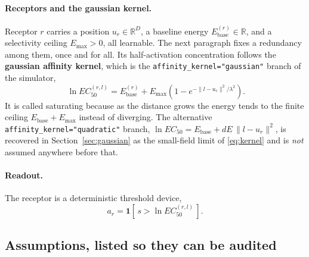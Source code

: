 \documentclass[11pt,a4paper]{article}
\newcommand{\RR}{\mathbb{R}}
\newcommand{\Ebase}{E_{\mathrm{base}}}
\newcommand{\Emax}{E_{\mathrm{max}}}
\begin{document}
\paragraph{Receptors and the gaussian kernel.} Receptor $r$ carries a position
$u_r \in \RR^D$, a baseline energy $\Ebase^{(r)} \in \RR$, and a selectivity ceiling
$\Emax > 0$, all learnable. The next paragraph fixes a redundancy among them, once
and for all. Its half-activation concentration follows
the \textbf{gaussian affinity kernel}, which is the
\texttt{affinity\_kernel="gaussian"} branch of the simulator,
\begin{equation}
  \boxed{\;\ln EC_{50}^{(r,l)}
   = \Ebase^{(r)} + \Emax\left(1 - e^{-\|l-u_r\|^2/\lambda^2}\right). }
  \label{eq:kernel}
\end{equation}
It is called saturating because as the distance grows the energy tends to the finite
ceiling $\Ebase + \Emax$ instead of diverging. The alternative
\texttt{affinity\_kernel="quadratic"} branch, $\ln EC_{50} = \Ebase + dE\,\|l-u_r\|^2$,
is recovered in Section~\ref{sec:gaussian} as the small-field limit of \eqref{eq:kernel}
and is \emph{not} assumed anywhere before that.

\paragraph{Readout.} The receptor is a deterministic threshold device,
\begin{equation}
  a_r = \mathbf{1}\!\left[\, s > \ln EC_{50}^{(r,l)} \,\right].
  \label{eq:readout}
\end{equation}

\subsection{Assumptions, listed so they can be audited}
\end{document}
